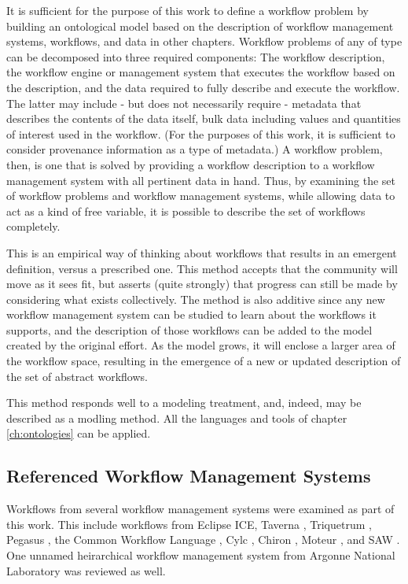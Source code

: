 It is sufficient for the purpose of this work to define a workflow problem
by building an ontological model based on the description of workflow
management systems, workflows, and data in other chapters. Workflow problems of
any of type can be decomposed into three required components: The workflow
description, the workflow engine or management system that executes the
workflow based on the description, and the data required to fully describe and
execute the workflow. The latter may include - but does not necessarily require
- metadata that describes the contents of the data itself, bulk data including
values and quantities of interest used in the workflow. (For the purposes of
this work, it is sufficient to consider provenance information as a type of
metadata.) A workflow problem, then, is one that is solved by providing a
workflow description to a workflow management system with all pertinent data in
hand. Thus, by examining the set of workflow problems and workflow management
systems, while allowing data to act as a kind of free variable, it is possible
to describe the set of workflows completely.

This is an empirical way of thinking about workflows that results in an emergent
definition, versus a prescribed one. This method accepts that the community will
move as it sees fit, but asserts (quite strongly) that progress can still be
made by considering what exists collectively. The method is also additive since
any new workflow management system can be studied to learn about the
workflows it supports, and the description of those workflows can be added to
the model created by the original effort. As the model grows, it will enclose a
larger area of the workflow space, resulting in the emergence of a new or
updated description of the set of abstract workflows.

This method responds well to a modeling treatment, and, indeed, may be described
as a modling method. All the languages and tools of chapter \ref{ch:ontologies}
can be applied.

\subsection{Referenced Workflow Management Systems}

Workflows from several workflow management systems were examined as part of this
work. This include workflows from Eclipse ICE, Taverna \cite{taverna},
Triquetrum \cite{triquetrum}, Pegasus \cite{pegasus}, the Common Workflow
Language \cite{cwl}, Cylc \cite{cylc}, Chiron \cite{chiron}, Moteur
\cite{Moteur}, and SAW \cite{SAW}. One unnamed heirarchical workflow management
system from Argonne National Laboratory was reviewed as well.

